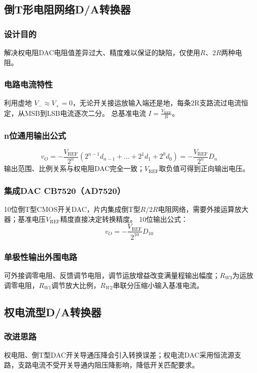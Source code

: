 \subsection{倒T形电阻网络D/A转换器}
\subsubsection{设计目的}
解决权电阻DAC电阻值差异过大、精度难以保证的缺陷，仅使用$R、2R$两种电阻。

\subsubsection{电路电流特性}
利用虚地 $V_- \approx V_+=0$，无论开关接运放输入端还是地，每条2R支路流过电流恒定，从MSB到LSB电流逐次二分。
总基准电流 $I=\frac{V_\text{REF}}{R}$。

\subsubsection{n位通用输出公式}
\[
v_O = -\frac{V_\text{REF}}{2^n}\left(2^{n-1}d_{n-1}+\dots+2^1d_1+2^0d_0\right)
= -\frac{V_\text{REF}}{2^n}D_n
\]
输出范围、比例关系与权电阻DAC完全一致；$V_\text{REF}$取负值可得到正向输出电压。

\subsubsection{集成DAC CB7520（AD7520）}
10位倒T型CMOS开关DAC，片内集成倒T型$R/2R$电阻网络，需要外接运算放大器；基准电压$V_\text{REF}$精度直接决定转换精度。
10位输出公式：
\[
v_O = -\frac{V_\text{REF}}{2^{10}} D_{10}
\]

\subsubsection{单极性输出外围电路}
可外接调零电阻、反馈调节电阻，调节运放增益改变满量程输出幅度；$R_{W3}$为运放调零电阻，$R_{W1}$调节放大比例，$R_{W2}$串联分压缩小输入基准电流。

\subsection{权电流型D/A转换器}
\subsubsection{改进思路}
权电阻、倒T型DAC开关导通压降会引入转换误差；权电流DAC采用恒流源支路，支路电流不受开关导通内阻压降影响，降低开关匹配要求。


